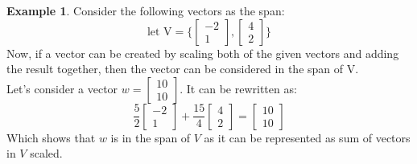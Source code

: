 \documentclass[table]{article}
\theoremstyle{definition}
\newtheorem{ex}{Example}[section]
\begin{document}
  \begin{ex}
    Consider the following vectors as the span:
    \[
      \text{let V} = \{
      \begin{bmatrix}
        -2 \\ 1
      \end{bmatrix}
      ,
      \begin{bmatrix}
        4 \\ 2
      \end{bmatrix}
      \}   \]
    Now, if a vector can be created by scaling both of the given vectors and adding the result together, then the vector can be considered in the span of V. \\
    Let's consider a vector $w = \begin{bmatrix}10 \\ 10\end{bmatrix}$. It can be rewritten as:
    \[ \frac{5}{2} \begin{bmatrix}
    -2 \\ 1 
    \end{bmatrix}
    + \frac{15}{4} \begin{bmatrix}
      4 \\ 2
    \end{bmatrix}
    = \begin{bmatrix}
      10 \\ 10
    \end{bmatrix}
  \]
  Which shows that $w$ is in the span of $V$ as it can be represented as sum of vectors in $V$ scaled.
  \end{ex}
\end{document}
